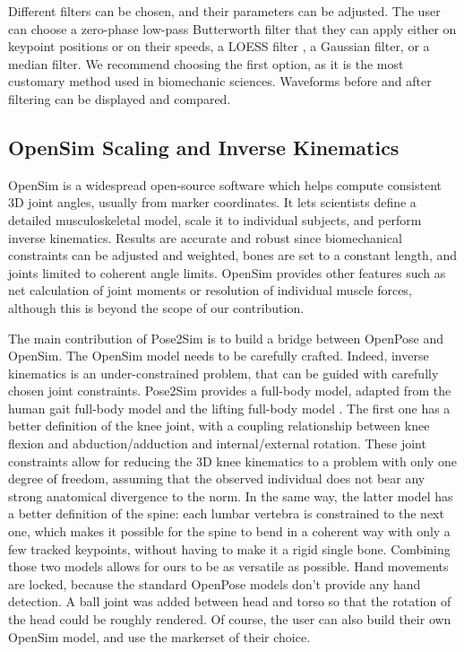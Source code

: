 Different filters can be chosen, and their parameters can be adjusted. The user can choose a zero-phase low-pass Butterworth filter \cite{Butterworth1930} that they can apply either on keypoint positions or on their speeds, a LOESS filter \cite{Cleveland1981}, a Gaussian filter, or a median filter. We recommend choosing the first option, as it is the most customary method used in biomechanic sciences. Waveforms before and after filtering can be displayed and compared.



\subsection{OpenSim Scaling and Inverse Kinematics}

OpenSim \cite{Delp2007,Seth2018} is a widespread open-source software which helps compute consistent 3D joint angles, usually from marker coordinates. It lets scientists define a detailed musculoskeletal model, scale it to individual subjects, and perform inverse kinematics. Results are accurate and robust since biomechanical constraints can be adjusted and weighted, bones are set to a constant length, and joints limited to coherent angle limits. OpenSim provides other features such as net calculation of joint moments or resolution of individual muscle forces, although this is beyond the scope of our contribution.

The main contribution of Pose2Sim is to build a bridge between OpenPose and OpenSim. The OpenSim model needs to be carefully crafted. Indeed, inverse kinematics is an under-constrained problem, that can be guided with carefully chosen joint constraints. Pose2Sim provides a full-body model, adapted from the human gait full-body model \cite{Rajagopal2016} and the lifting full-body model \cite{Beaucage-Gauvreau2019}. The first one has a better definition of the knee joint, with a coupling relationship between knee flexion and abduction/adduction and internal/external rotation. These joint constraints allow for reducing the 3D knee kinematics to a problem with only one degree of freedom, assuming that the observed individual does not bear any strong anatomical divergence to the norm. In the same way, the latter model has a better definition of the spine: each lumbar vertebra is constrained to the next one, which makes it possible for the spine to bend in a coherent way with only a few tracked keypoints, without having to make it a rigid single bone. Combining those two models allows for ours to be as versatile as possible. Hand movements are locked, because the standard OpenPose models don't provide any hand detection. A ball joint was added between head and torso so that the rotation of the head could be roughly rendered. Of course, the user can also build their own OpenSim model, and use the markerset of their choice.

